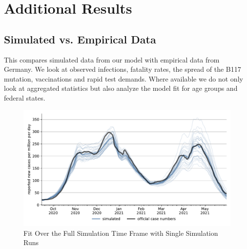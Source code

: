 \section{Additional Results}
\label{sec:additional_results}

\subsection{Simulated vs. Empirical Data}
\label{subsec:fit_results}

This compares simulated data from our model with empirical data from Germany. We look at
observed infections, fatality rates, the spread of the B117 mutation, vaccinations and
rapid test demands. Where available we do not only look at aggregated statistics but also
analyze the model fit for age groups and federal states.%


\begin{figure}[ht]
  \centering
  \includegraphics[width=\textwidth]{figures/results/figures/scenario_comparisons/combined_fit/full_new_known_case_with_single_runs}
  \caption{Fit Over the Full Simulation Time Frame with Single Simulation Runs}
  \label{fig:aggregated_fit2}
\end{figure}

